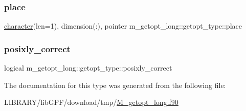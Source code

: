 \subsubsection{\texorpdfstring{place}{place}}
{\footnotesize\ttfamily \hyperlink{option__stopwatch_83_8txt_abd4b21fbbd175834027b5224bfe97e66}{character}(len=1), dimension(\+:), pointer m\+\_\+getopt\+\_\+long\+::getopt\+\_\+type\+::place}

\mbox{\label{structm__getopt__long_1_1getopt__type_a8d4f22423343ddddac8ad75e8c5e35a3}} 
\subsubsection{\texorpdfstring{posixly\+\_\+correct}{posixly\_correct}}
{\footnotesize\ttfamily logical m\+\_\+getopt\+\_\+long\+::getopt\+\_\+type\+::posixly\+\_\+correct}



The documentation for this type was generated from the following file\+:\begin{DoxyCompactItemize}
\item 
L\+I\+B\+R\+A\+R\+Y/lib\+G\+P\+F/download/tmp/\hyperlink{M__getopt__long_8f90}{M\+\_\+getopt\+\_\+long.\+f90}\end{DoxyCompactItemize}
